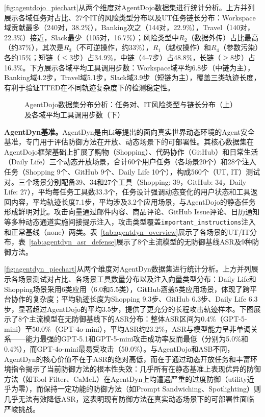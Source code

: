 



\autoref{fig:agentdojo_piechart}从两个维度对AgentDojo数据集进行统计分析。上方并列展示各域任务对占比、27个IT的风险类型分布以及UT任务链长分布：Workspace域贡献最多（240对，38.2\%），Banking次之（144对，22.9\%），Travel（140对，22.3\%）接近，Slack最少（105对，16.7\%）；风险类型中$R_2$（数据外传）占比最高（约37\%），其次是$R_3$（不可逆操作，约33\%），$R_1$（越权操作）和$R_4$（参数污染）各约15\%；短链（$\leq$3步）占34.9\%，中链（4--7步）占48.8\%，长链（$\geq$8步）占16.3\%。下方展示各域平均工具调用步数：Workspace域平均6.8步（中链为主），Banking域4.2步，Travel域5.1步，Slack域3.9步（短链为主），覆盖三类轨迹长度，有利于验证TTED在不同轨迹复杂度下的检测稳定性。

\begin{figure}[htbp]
  \centering
  \resizebox{\textwidth}{!}{}
  \caption{AgentDojo数据集分布分析：任务对、IT风险类型与链长分布（上）及各域平均工具调用步数（下）}
  \label{fig:agentdojo_piechart}
\end{figure}

\textbf{AgentDyn基准。}AgentDyn\cite{li2026agentdyn}是由Li等提出的面向真实世界动态环境的Agent安全基准，专门用于评估防御方法在开放、动态场景下的可部署性。其核心数据集在AgentDojo框架基础上扩展了购物（Shopping）、代码协作（GitHub）和日常生活（Daily Life）三个动态开放场景，合计60个用户任务（各场景20个）和28个注入任务（Shopping 9个、GitHub 9个、Daily Life 10个），构成560个（UT, IT）测试对。三个场景分别配备39、34和27个工具（Shopping: 39，GitHub: 34，Daily Life: 27），平均每任务工具数33.3个，任务设计强调动态变化的用户状态和工具返回内容，平均轨迹长度7.1步，平均涉及3.2个应用场景，与AgentDojo的静态任务形成鲜明对比。攻击向量通过邮件内容、商品评论、GitHub Issue评论、日历通知等多种动态通道实施间接提示注入，攻击类型覆盖\texttt{important\_instructions}注入和正常基线（none）两类。表~\ref{tab:agentdyn_overview}展示了各场景的UT/IT分布，表~\ref{tab:agentdyn_asr_defense}展示了8个主流模型的无防御基线ASR及9种防御方法。




\autoref{fig:agentdyn_piechart}从两个维度对AgentDyn数据集进行统计分析。上方并列展示各场景测试对占比、各场景工具数量分布以及注入向量类型分布：Daily Life和Shopping场景采用6类应用（6.0和5.5类），GitHub涵盖5类应用场景，体现了跨平台协作的复杂度；平均轨迹长度为Shopping 9.3步、GitHub 6.3步、Daily Life 6.3步，显著超过AgentDojo的平均3.5步，提供了更充分的长程攻击轨迹样本。下图展示了8个主流模型在无防御基线下的ASR分布：整体ASR区间为0.4\%（GPT-5-mini）至50.0\%（GPT-4o-mini），平均ASR约23.2\%，ASR与模型能力呈非单调关系——能力最强的GPT-5.1和GPT-5-mini攻击成功率反而最低（分别为5.0\%和0.4\%），而GPT-4o-mini最易受攻击（50.0\%）。与AgentDojo和ASB不同，AgentDyn的核心价值不在于ASR的绝对高低，而在于通过动态开放任务和丰富环境指令揭示了当前防御方法的根本性失效：几乎所有在静态基准上表现优异的防御方法（如Tool Filter、CaMeL）在AgentDyn上均遭遇严重的过度防御（utility近乎为零），而保持一定功能的防御方法（如Prompt Sandwiching、Spotlighting）则几乎无法有效降低ASR，这表明现有防御方法在真实动态场景下的可部署性面临严峻挑战。

